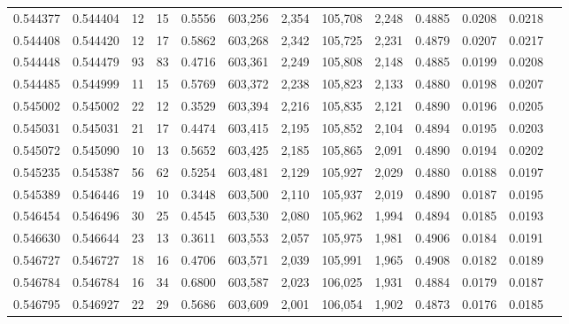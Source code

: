 \begin{tabular}{rrrrrrrrrrrrr}
0.544377 & 0.544404 &    12 &    15 &                                     0.5556 & 603,256 &   2,354 & 105,708 &   2,248 & 0.4885 & 0.0208 & 0.0218 \\
0.544408 & 0.544420 &    12 &    17 &                                     0.5862 & 603,268 &   2,342 & 105,725 &   2,231 & 0.4879 & 0.0207 & 0.0217 \\
0.544448 & 0.544479 &    93 &    83 &                                     0.4716 & 603,361 &   2,249 & 105,808 &   2,148 & 0.4885 & 0.0199 & 0.0208 \\
0.544485 & 0.544999 &    11 &    15 &                                     0.5769 & 603,372 &   2,238 & 105,823 &   2,133 & 0.4880 & 0.0198 & 0.0207 \\
0.545002 & 0.545002 &    22 &    12 &                                     0.3529 & 603,394 &   2,216 & 105,835 &   2,121 & 0.4890 & 0.0196 & 0.0205 \\
0.545031 & 0.545031 &    21 &    17 &                                     0.4474 & 603,415 &   2,195 & 105,852 &   2,104 & 0.4894 & 0.0195 & 0.0203 \\
0.545072 & 0.545090 &    10 &    13 &                                     0.5652 & 603,425 &   2,185 & 105,865 &   2,091 & 0.4890 & 0.0194 & 0.0202 \\
0.545235 & 0.545387 &    56 &    62 &                                     0.5254 & 603,481 &   2,129 & 105,927 &   2,029 & 0.4880 & 0.0188 & 0.0197 \\
0.545389 & 0.546446 &    19 &    10 &                                     0.3448 & 603,500 &   2,110 & 105,937 &   2,019 & 0.4890 & 0.0187 & 0.0195 \\
0.546454 & 0.546496 &    30 &    25 &                                     0.4545 & 603,530 &   2,080 & 105,962 &   1,994 & 0.4894 & 0.0185 & 0.0193 \\
0.546630 & 0.546644 &    23 &    13 &                                     0.3611 & 603,553 &   2,057 & 105,975 &   1,981 & 0.4906 & 0.0184 & 0.0191 \\
0.546727 & 0.546727 &    18 &    16 &                                     0.4706 & 603,571 &   2,039 & 105,991 &   1,965 & 0.4908 & 0.0182 & 0.0189 \\
0.546784 & 0.546784 &    16 &    34 &                                     0.6800 & 603,587 &   2,023 & 106,025 &   1,931 & 0.4884 & 0.0179 & 0.0187 \\
0.546795 & 0.546927 &    22 &    29 &                                     0.5686 & 603,609 &   2,001 & 106,054 &   1,902 & 0.4873 & 0.0176 & 0.0185 \\

\end{tabular}
